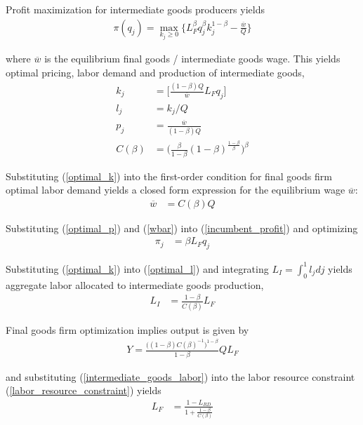 \documentclass[12pt,english]{article}
\theoremstyle{remark}
\begin{document}
Profit maximization for intermediate goods producers yields
\begin{align}
\pi(q_j) = \max_{k_j \ge 0} \Big\{ L_F^{\beta} q_j^{\beta} k_j^{1-\beta} - \frac{\overline{w}}{Q} \Big\} \label{incumbent_profit}
\end{align}

where $\overline{w}$ is the equilibrium final goods / intermediate goods wage.
This yields optimal pricing, labor demand and production of intermediate goods,
\begin{align}
k_j &= \Big[ \frac{(1-\beta) Q}{\overline{w}} L_F q_j  \Big] \label{optimal_k}\\
l_j &= k_j / Q \label{optimal_l}\\
p_j &= \frac{\overline{w}}{(1-\beta) Q} \label{optimal_p}\\
C(\beta) &= \Big(\frac{\beta}{1-\beta} (1-\beta)^{\frac{1-\beta}{\beta}} \Big)^{\beta} \label{def_cbeta}
\end{align}

Substituting (\ref{optimal_k}) into the first-order condition for final goods firm optimal labor demand yields a closed form expression for the equilibrium wage $\overline{w}$:
\begin{align}
\overline{w} &= C(\beta) Q \label{wbar}
\end{align}

Substituting (\ref{optimal_p}) and (\ref{wbar}) into (\ref{incumbent_profit}) and optimizing
\begin{align}
\pi_j &= \beta L_F q_j \label{profits_eq}
\end{align}

Substituting (\ref{optimal_k}) into (\ref{optimal_l}) and integrating $L_I = \int_0^1 l_j dj$ yields aggregate labor allocated to intermediate goods production,
\begin{align}
L_I &= \frac{1-\beta}{C(\beta)}L_F \label{intermediate_goods_labor}
\end{align}

Final goods firm optimization implies output is given by 
\begin{align}
Y = \frac{\Big((1-\beta)C(\beta)^{-1}\Big)^{1-\beta}}{1-\beta} Q L_F
\end{align}

and substituting (\ref{intermediate_goods_labor}) into the labor resource constraint (\ref{labor_resource_constraint}) yields
\begin{align}
L_F &= \frac{1 - L_{RD}}{1 + \frac{1-\beta}{C(\beta)}}
\end{align}
\end{document}
